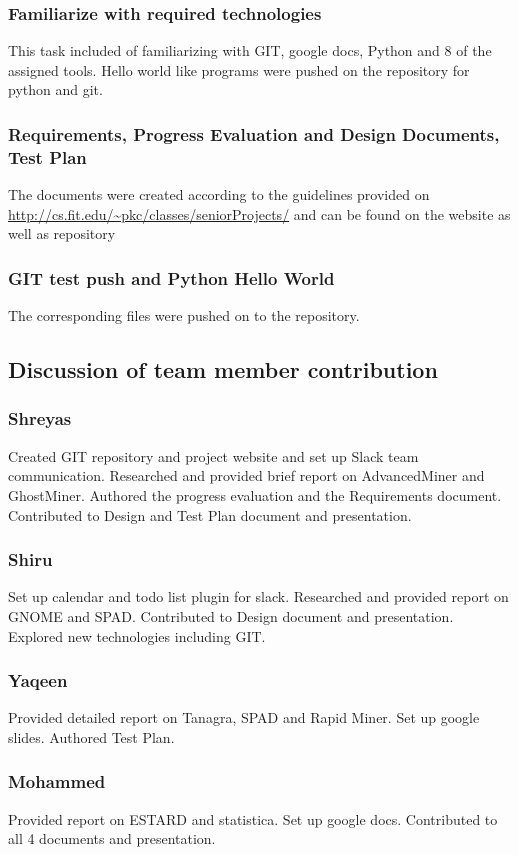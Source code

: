 \documentclass[12pt]{article}
\begin{document}
	\subsubsection{Familiarize with required technologies}
	This task included of familiarizing with GIT, google docs, Python and 8 of the assigned tools. Hello world like programs were pushed on the repository for python and git.
	\subsubsection{Requirements, Progress Evaluation and Design Documents, Test Plan}
	The documents were created according to the guidelines provided on \url{http://cs.fit.edu/~pkc/classes/seniorProjects/} and can be found on the website as well as repository
	\subsubsection{GIT test push and Python Hello World}
	The corresponding files were pushed on to the repository.
	\subsection{Discussion of team member contribution}
	\subsubsection{Shreyas}
	Created GIT repository and project website and set up Slack team communication. Researched and provided brief report on AdvancedMiner and GhostMiner. Authored the progress evaluation and the Requirements document. Contributed to Design and Test Plan document and presentation.
	\subsubsection{Shiru}
	Set up calendar and todo list plugin for slack. Researched and provided report on GNOME and SPAD. Contributed to Design document and presentation. Explored new technologies including GIT. 
	\subsubsection{Yaqeen}
	Provided detailed report on Tanagra, SPAD and Rapid Miner. Set up google slides. Authored Test Plan.
	\subsubsection{Mohammed}
	Provided report on ESTARD and statistica. Set up google docs. Contributed to all 4 documents and presentation.
	
\end{document}
